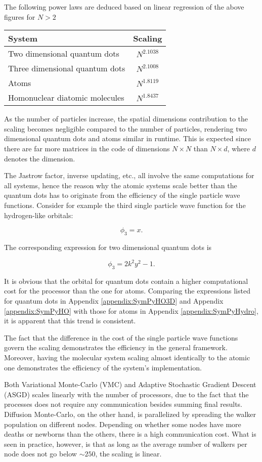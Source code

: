 The following power laws are deduced based on linear regression of the above figures for $N > 2$

\begin{tabular}{l|c}
System & Scaling \\
\hline
Two dimensional quantum dots & $N^{2.1038}$ \\
Three dimensional quantum dots & $N^{2.1008}$ \\
Atoms & $N^{1.8119}$ \\
Homonuclear diatomic molecules & $N^{1.8437}$ \\ 
\end{tabular}


As the number of particles increase, the spatial dimensions contribution to the scaling becomes negligible compared to the number of particles, rendering two dimensional quantum dots and atoms similar in runtime. This is expected since there are far more matrices in the code of dimensions $N\times N$ than $N \times d$, where $d$ denotes the dimension. 

The Jastrow factor, inverse updating, etc., all involve the same computations for all systems, hence the reason why the atomic systems scale better than the quantum dots has to originate from the efficiency of the single particle wave functions. Consider for example the third single particle wave function for the hydrogen-like orbitals:

\begin{equation}
 \phi_3 = x.
\end{equation}

The corresponding expression for two dimensional quantum dots is

\begin{equation}
  \phi_3 = 2k^2y^2 - 1.
\end{equation}

It is obvious that the orbital for quantum dots contain a higher computational cost for the processor than the one for atoms. Comparing the expressions listed for quantum dots in Appendix \ref{appendix:SymPyHO3D} and Appendix \ref{appendix:SymPyHO} with those for atoms in Appendix \ref{appendix:SymPyHydro}, it is apparent that this trend is consistent.

The fact that the difference in the cost of the single particle wave functions govern the scaling demonstrates the efficiency in the general framework. Moreover, having the molecular system scaling almost identically to the atomic one demonstrates the efficiency of the system's implementation. 

Both Variational Monte-Carlo (VMC) and Adaptive Stochastic Gradient Descent (ASGD) scales linearly with the number of processors, due to the fact that the processes does not require any communication besides summing final results. Diffusion Monte-Carlo, on the other hand, is parallelized by spreading the walker population on different nodes. Depending on whether some nodes have more deaths or newborns than the others, there is a high communication cost. What is seen in practice, however, is that as long as the average number of walkers per node does not go below $\sim250$, the scaling is linear. 




